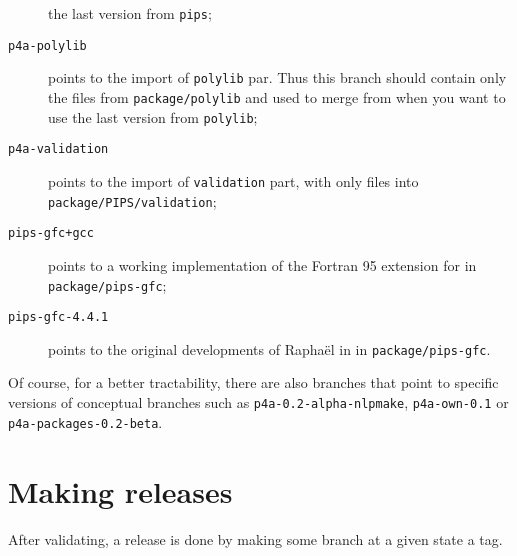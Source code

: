 \documentclass[a4paper]{article}
\begin{document}
\begin{description}
  the last version from \texttt{pips};
\item[\texttt{p4a-polylib}] points to the import of \Apips \texttt{polylib}
  par. Thus this branch should contain only the files from
  \texttt{package/polylib} and used to merge from when you want to use
  the last version from \texttt{polylib};
\item[\texttt{p4a-validation}] points to the import of \Apips
  \texttt{validation} part, with only files into
  \texttt{package/PIPS/validation};
\item[\texttt{pips-gfc+gcc}] points to a working \Apipsgfc implementation
  of the Fortran 95 extension for \Apips in \texttt{package/pips-gfc};
\item[\texttt{pips-gfc-4.4.1}] points to the original developments of
  Raphaël in \Agcc in \texttt{package/pips-gfc}.
\end{description}


Of course, for a better tractability, there are also branches that point
to specific versions of conceptual branches such as
\texttt{p4a-0.2-alpha-nlpmake}, \texttt{p4a-own-0.1} or
\texttt{p4a-packages-0.2-beta}.


\section{Making releases}
\label{sec:releases}

After validating, a release is done by making some branch at a given state
a tag.
\end{document}
